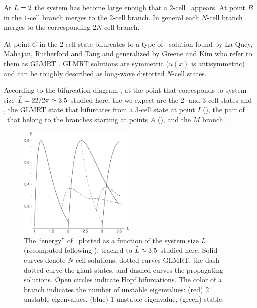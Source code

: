 At $\tilde{L}=2$ the system has become large enough 
that a $2$-cell \eqv\ appears. 
At point $B$ in 
the $1$-cell branch merges to the $2$-cell branch. 
In general each $N$-cell branch merges to the corresponding $2N$-cell branch.

At point $C$ in 
the $2$-cell state bifurcates to a type of 
\eqv\ solution
found by La Quey, Mahajan, Rutherford and Tang and generalized by Greene and Kim who refer to them as GLMRT \eqva. GLMRT solutions are symmetric 
($u(x)$ is antisymmetric)
and can be roughly described as long-wave distorted $N$-cell states.


According to the bifurcation diagram 
, 
at the point that corresponds to system size $\tilde{L}=22/2\pi \simeq 3.5$
studied here,
the {\eqva} we expect are the $2$- and $3$-cell states  and ,
the GLMRT state that bifurcates from a $3$-cell state at point $I$ (),
the pair of \reqva\ that belong to the branches starting at points $A$ (),
and the $M$ branch  \reqva\ .

\begin{figure}[t]
\begin{center} 
\includegraphics[width=0.5\textwidth]{figs/ksBifDiag.eps}
\end{center}
\caption{
The ``energy''   of \eqva\
plotted as a function of the system size
$\tilde{L}$ (recomputed following ), tracked to
$\tilde{L} \approx 3.5$ studied here.
Solid curves denote $N$-cell solutions,
dotted curves GLMRT, the dash-dotted curve the
giant states, and dashed curves the propagating solutions.
Open circles indicate Hopf bifurcations. 
The color of a branch indicates the number of unstable
eigenvalues: (red) 2 unstable eigenvalues, (blue) 1
unstable eigenvalue, (green) stable. 
        }
\label{fig:ksBifDiag}
\end{figure}


